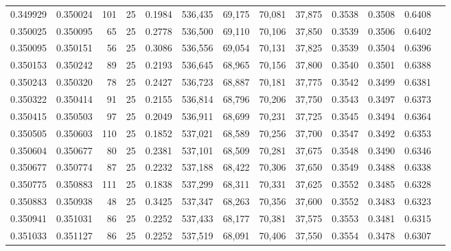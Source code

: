 \begin{tabular}{rrrrrrrrrrrrr}
0.349929 & 0.350024 &   101 &  25 &                                     0.1984 & 536,435 &  69,175 &  70,081 &  37,875 & 0.3538 & 0.3508 & 0.6408 \\
0.350025 & 0.350095 &    65 &  25 &                                     0.2778 & 536,500 &  69,110 &  70,106 &  37,850 & 0.3539 & 0.3506 & 0.6402 \\
0.350095 & 0.350151 &    56 &  25 &                                     0.3086 & 536,556 &  69,054 &  70,131 &  37,825 & 0.3539 & 0.3504 & 0.6396 \\
0.350153 & 0.350242 &    89 &  25 &                                     0.2193 & 536,645 &  68,965 &  70,156 &  37,800 & 0.3540 & 0.3501 & 0.6388 \\
0.350243 & 0.350320 &    78 &  25 &                                     0.2427 & 536,723 &  68,887 &  70,181 &  37,775 & 0.3542 & 0.3499 & 0.6381 \\
0.350322 & 0.350414 &    91 &  25 &                                     0.2155 & 536,814 &  68,796 &  70,206 &  37,750 & 0.3543 & 0.3497 & 0.6373 \\
0.350415 & 0.350503 &    97 &  25 &                                     0.2049 & 536,911 &  68,699 &  70,231 &  37,725 & 0.3545 & 0.3494 & 0.6364 \\
0.350505 & 0.350603 &   110 &  25 &                                     0.1852 & 537,021 &  68,589 &  70,256 &  37,700 & 0.3547 & 0.3492 & 0.6353 \\
0.350604 & 0.350677 &    80 &  25 &                                     0.2381 & 537,101 &  68,509 &  70,281 &  37,675 & 0.3548 & 0.3490 & 0.6346 \\
0.350677 & 0.350774 &    87 &  25 &                                     0.2232 & 537,188 &  68,422 &  70,306 &  37,650 & 0.3549 & 0.3488 & 0.6338 \\
0.350775 & 0.350883 &   111 &  25 &                                     0.1838 & 537,299 &  68,311 &  70,331 &  37,625 & 0.3552 & 0.3485 & 0.6328 \\
0.350883 & 0.350938 &    48 &  25 &                                     0.3425 & 537,347 &  68,263 &  70,356 &  37,600 & 0.3552 & 0.3483 & 0.6323 \\
0.350941 & 0.351031 &    86 &  25 &                                     0.2252 & 537,433 &  68,177 &  70,381 &  37,575 & 0.3553 & 0.3481 & 0.6315 \\
0.351033 & 0.351127 &    86 &  25 &                                     0.2252 & 537,519 &  68,091 &  70,406 &  37,550 & 0.3554 & 0.3478 & 0.6307 \\

\end{tabular}
